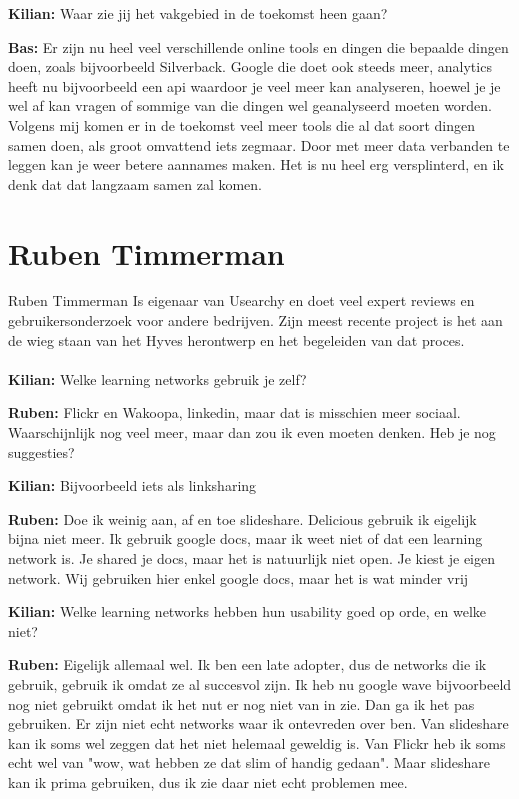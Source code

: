 \textbf{Kilian:} Waar zie jij het vakgebied in de toekomst heen gaan?

\textbf{Bas:} Er zijn nu heel veel verschillende online tools en dingen die bepaalde dingen doen, zoals bijvoorbeeld Silverback. Google die doet ook steeds meer, analytics heeft nu bijvoorbeeld een api waardoor je veel meer kan analyseren, hoewel je je wel af kan vragen of sommige van die dingen wel geanalyseerd moeten worden. Volgens mij komen er in de toekomst veel meer tools die al dat soort dingen samen doen, als groot omvattend iets zegmaar. Door met meer data verbanden te leggen kan je weer betere aannames maken. Het is nu heel erg versplinterd, en ik denk dat dat langzaam samen zal komen.

\section{Ruben Timmerman}
Ruben Timmerman Is eigenaar van Usearchy en doet veel expert reviews en gebruikersonderzoek voor andere bedrijven. Zijn meest recente project is het aan de wieg staan van het Hyves herontwerp en het begeleiden van dat proces.

\paragraph{}
\textbf{Kilian:} Welke learning networks gebruik je zelf?

\textbf{Ruben:} Flickr en Wakoopa, linkedin, maar dat is misschien meer sociaal. Waarschijnlijk nog veel meer, maar dan zou ik even moeten denken. Heb je nog suggesties?

\textbf{Kilian:} Bijvoorbeeld iets als linksharing

\textbf{Ruben:} Doe ik weinig aan, af en toe slideshare. Delicious gebruik ik eigelijk bijna niet meer. Ik gebruik google docs, maar ik weet niet of dat een learning network is. Je shared je docs, maar het is natuurlijk niet open. Je kiest je eigen network. Wij gebruiken hier enkel google docs, maar het is wat minder vrij

\textbf{Kilian:} Welke learning networks hebben hun usability goed op orde, en welke niet?

\textbf{Ruben:} Eigelijk allemaal wel. Ik ben een late adopter, dus de networks die ik gebruik, gebruik ik omdat ze al succesvol zijn. Ik heb nu google wave bijvoorbeeld nog niet gebruikt omdat ik het nut er nog niet van in zie. Dan ga ik het pas gebruiken. Er zijn niet echt networks waar ik ontevreden over ben. Van slideshare kan ik soms wel zeggen dat het niet helemaal geweldig is. Van Flickr heb ik soms echt wel van "wow, wat hebben ze dat slim of handig gedaan". Maar slideshare kan ik prima gebruiken, dus ik zie daar niet echt problemen mee.

